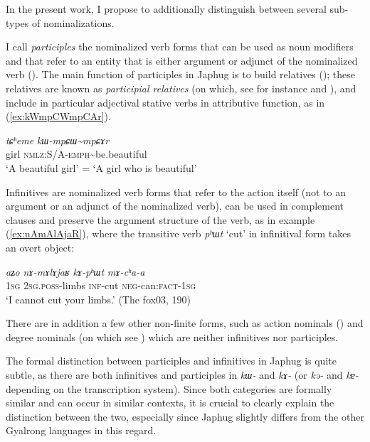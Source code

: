 \documentclass[oneside,a4paper,11pt]{article}
\newcommand{\ipa}[1]{\textit{\phon#1}}
\newcommand{\jpg}[2]{\ipa{#1} `#2'}
\newcommand{\tld}{\textasciitilde{}}
\newcommand{\refb}[1]{(\ref{#1})}
\begin{document}
In the present work, I propose to additionally distinguish between several sub-types of nominalizations.

I call \textit{participles} the nominalized verb forms that can be used as noun modifiers and that refer to an entity that is either argument or adjunct of the nominalized verb (\citealt[224]{creissels06sgit1}). The main function of participles in Japhug is to build relatives (\citealt{jacques16relatives}); these relatives are known as \textit{participial relatives} (on which, see for instance \citealt[50-58;73-5;156-7]{lehmann84relativsatz} and \citealt[214]{creissels06sgit2}), and include in particular adjectival stative verbs in attributive function, as in (\ref{ex:kWmpCWmpCAr}).

\begin{exe}
\ex \label{ex:kWmpCWmpCAr}
\gll 
\ipa{tɕʰeme} \ipa{kɯ-mpɕɯ\tld{}mpɕɤr} \\
girl \textsc{nmlz:S/A-emph}\tld{}be.beautiful \\
\glt `A beautiful girl' = `A girl who is beautiful'
\end{exe}

Infinitives are nominalized verb forms that refer to the action itself (not to an argument or an adjunct of the nominalized verb), can be used in complement clauses and preserve the argument structure of the verb, as in example \refb{ex:nAmAlAjaR}, where the transitive verb \jpg{pʰɯt}{cut} in infinitival form takes an overt object:

\begin{exe}
\ex \label{ex:nAmAlAjaR}
\gll 
\ipa{aʑo}	\ipa{nɤ-mɤlɤjaʁ}	\ipa{kɤ-pʰɯt}	\ipa{mɤ-cʰa-a} \\
\textsc{1sg} \textsc{2sg.poss}-limbs \textsc{inf}-cut \textsc{neg}-can:\textsc{fact-1sg} \\
\glt `I cannot cut your limbs.' (The fox03, 190)
\end{exe}

There are in addition a few other non-finite forms, such as action nominals (\citealt{jacques14antipassive}) and degree nominals (on which see \citealt{jacques16comparative}) which are neither infinitives nor participles.

The formal distinction between participles and infinitives in Japhug is quite subtle, as there are both infinitives and participles in \ipa{kɯ-} and \ipa{kɤ-} (or \ipa{kə-} and \ipa{kɐ-} depending on the transcription system). Since both categories are formally similar and can occur in similar contexts, it is crucial to clearly explain the distinction between the two, especially since Japhug slightly differs from the other Gyalrong languages in this regard.
\end{document}
